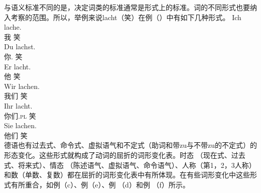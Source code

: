 与语义标准不同的是，决定词类的标准通常是形式上的标准。词的不同形式也要纳入考察的范围。所以，举例来说lacht（笑）在例（）中有如下几种形式。
\eal
\ex 
\gll Ich lache.\\
     我 笑\\
\ex 
\gll Du lachst.\\
     你.\sg{} 笑\\
\ex 
\gll Er lacht.\\
     他 笑\\
\ex 
\gll Wir lachen.\\
     我们 笑\\
\ex 
\gll Ihr lacht.\\
     你们.\textsc{pl} 笑\\
\ex 
\gll Sie lachen.\\
     他们 笑\\
\zl
德语也有过去式、命令式、虚拟语气和不定式（助词和带zu与不带zu的不定式）的形态变化。这些形式就构成了动词的屈折的词形变化表。时态 （现在式、过去式、将来式）、情态 （陈述语气、虚拟语气、命令语气）、人称（第1，2，3人称）和数（单数、复数）都在屈折的词形变化表中有所体现。在有些词形变化中这些形式有所重合，如例（c）、例（e）、例 （d）和例 （f）所示。

